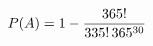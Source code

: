 \documentclass[preview]{standalone}
\begin{document}
\begin{align*}
\special{dvisvgm:raw <g id='unique000'>}P(A)=1-\frac{365!}{335!\,365^{30}}\special{dvisvgm:raw </g>}
\end{align*}
\end{document}
